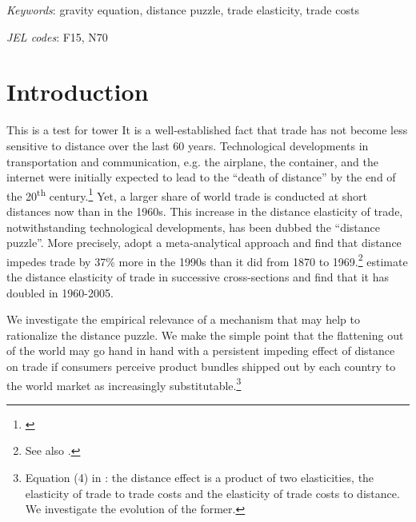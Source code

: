 \documentclass[12pt,twoside,a4paper,notitlepage]{article}
\begin{document}
\textit{Keywords}: gravity equation, distance puzzle, trade elasticity, trade costs

\textit{JEL codes}: F15, N70
\clearpage

\section*{Introduction}

This is a test for tower
It is a well-established fact that trade has not become less sensitive to distance over the last 60 years.
Technological developments in transportation and communication, e.g. the airplane, the container, and the internet were initially expected to lead to the ``death of distance'' by the end of the 20\textsuperscript{th} century.\footnote{\cite{Cairncross1997,Levinson2006,Friedman2007}}
Yet, a larger share of world trade is conducted at short distances now than in the 1960s.
This increase in the distance elasticity of trade, notwithstanding technological developments, has been dubbed the ``distance puzzle''.
More precisely, \cite{Disdier2008} adopt a meta-analytical approach and find that distance impedes trade by 37\% more in the 1990s than it did from 1870 to 1969.\footnote{See also \cite{Berthelon2008,Combes2006, Brun2005, Buch2004}.}
\cite{Head2013} estimate the distance elasticity of trade in successive cross-sections and find that it has doubled in 1960-2005.

We investigate the empirical relevance of a mechanism that may help to rationalize the distance puzzle.
We make the simple point that the flattening out of the world may go hand in hand with a persistent impeding effect of distance on trade if consumers perceive product bundles shipped out by each country to the world market as increasingly substitutable.\footnote{Equation (4) in \cite{Head2013}: the distance effect is a product of two elasticities, the elasticity of trade to trade costs and the elasticity of trade costs to distance.
We investigate the evolution of the former.}
\end{document}
